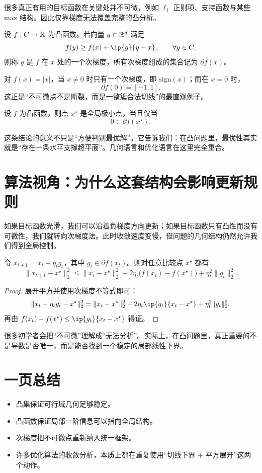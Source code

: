 \documentclass[11pt]{article}
\begin{document}
很多真正有用的目标函数在关键处并不可微，例如 $\ell_1$ 正则项、支持函数与某些 max 结构。因此仅靠梯度无法覆盖完整的凸分析。

\begin{definition}[次梯度]
设 $f:C\to \mathbb{R}$ 为凸函数。若向量 $g\in \mathbb{R}^d$ 满足
\[
f(y)\ge f(x)+\ip{g}{y-x}, \qquad \forall y\in C,
\]
则称 $g$ 是 $f$ 在 $x$ 处的一个次梯度，所有次梯度组成的集合记为 $\partial f(x)$。
\end{definition}

\begin{ExampleBox}
对 $f(x)=|x|$，当 $x\neq 0$ 时只有一个次梯度，即 $\mathrm{sign}(x)$；而在 $x=0$ 时，
\[
\partial f(0)=[-1,1].
\]
这正是“不可微点不是断裂，而是一整簇合法切线”的最直观例子。
\end{ExampleBox}

\begin{theorem}[最优性条件]
设 $f$ 为凸函数，则点 $x^\star$ 是全局极小点，当且仅当
\[
0\in \partial f(x^\star).
\]
\end{theorem}

\begin{AnalysisBox}
这条结论的意义不只是“方便判别最优解”。它告诉我们：在凸问题里，最优性其实就是“存在一条水平支撑超平面”。几何语言和优化语言在这里完全重合。
\end{AnalysisBox}

\section{算法视角：为什么这套结构会影响更新规则}

如果目标函数光滑，我们可以沿着负梯度方向更新；如果目标函数只有凸性而没有可微性，我们就转向次梯度法。此时收敛速度变慢，但问题的几何结构仍然允许我们得到全局控制。

\begin{lemma}[次梯度一步估计]
令 $x_{t+1}=x_t-\eta_t g_t$，其中 $g_t\in \partial f(x_t)$。则对任意比较点 $x^\star$ 都有
\[
\|x_{t+1}-x^\star\|_2^2
\le
\|x_t-x^\star\|_2^2
-2\eta_t\bigl(f(x_t)-f(x^\star)\bigr)
+\eta_t^2\|g_t\|_2^2.
\]
\end{lemma}

\begin{proof}
展开平方并使用次梯度不等式即可：
\[
\|x_t-\eta_t g_t-x^\star\|_2^2
= \|x_t-x^\star\|_2^2 - 2\eta_t\ip{g_t}{x_t-x^\star} + \eta_t^2\|g_t\|_2^2.
\]
再由 $f(x_t)-f(x^\star)\le \ip{g_t}{x_t-x^\star}$ 得证。
\end{proof}

\begin{RemarkBox}
很多初学者会把“不可微”理解成“无法分析”。实际上，在凸问题里，真正重要的不是导数是否唯一，而是能否找到一个稳定的局部线性下界。
\end{RemarkBox}

\section{一页总结}

\begin{itemize}
  \item 凸集保证可行域几何足够稳定。
  \item 凸函数保证局部一阶信息可以指向全局结构。
  \item 次梯度把不可微点重新纳入统一框架。
  \item 许多优化算法的收敛分析，本质上都在重复使用“切线下界 + 平方展开”这两个动作。
\end{itemize}
\end{document}
